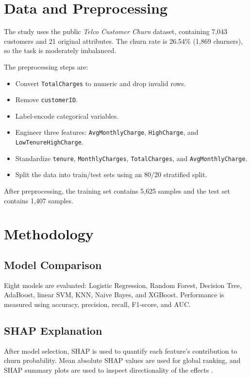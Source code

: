 \documentclass[conference]{IEEEtran}
\begin{document}
\section{Data and Preprocessing}
The study uses the public \emph{Telco Customer Churn} dataset, containing 7,043 customers and 21 original attributes. The churn rate is 26.54\% (1,869 churners), so the task is moderately imbalanced.

The preprocessing steps are:
\begin{itemize}[leftmargin=*]
    \item Convert \texttt{TotalCharges} to numeric and drop invalid rows.
    \item Remove \texttt{customerID}.
    \item Label-encode categorical variables.
    \item Engineer three features: \texttt{AvgMonthlyCharge}, \texttt{HighCharge}, and \texttt{LowTenureHighCharge}.
    \item Standardize \texttt{tenure}, \texttt{MonthlyCharges}, \texttt{TotalCharges}, and \texttt{AvgMonthlyCharge}.
    \item Split the data into train/test sets using an 80/20 stratified split.
\end{itemize}

After preprocessing, the training set contains 5,625 samples and the test set contains 1,407 samples.

\section{Methodology}
\subsection{Model Comparison}
Eight models are evaluated: Logistic Regression, Random Forest, Decision Tree, AdaBoost, linear SVM, KNN, Naive Bayes, and XGBoost. Performance is measured using accuracy, precision, recall, F1-score, and AUC.

\subsection{SHAP Explanation}
After model selection, SHAP is used to quantify each feature's contribution to churn probability. Mean absolute SHAP values are used for global ranking, and SHAP summary plots are used to inspect directionality of the effects \cite{lundberg2017unified}.
\end{document}
